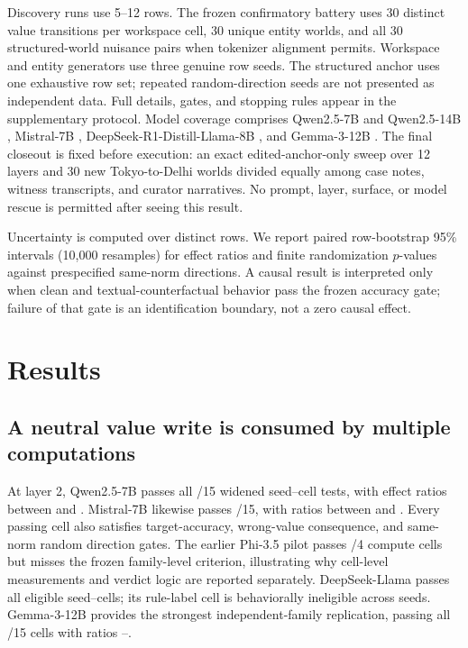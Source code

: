 \documentclass[10pt]{article}
\begin{document}
Discovery runs use 5--12 rows. The frozen confirmatory battery uses 30 distinct
value transitions per workspace cell, 30 unique entity worlds, and all 30
structured-world nuisance pairs when tokenizer alignment permits. Workspace
and entity generators use three genuine row seeds. The structured anchor uses
one exhaustive row set; repeated random-direction seeds are not presented as
independent data. Full details, gates, and stopping rules appear in the
supplementary protocol. Model coverage comprises Qwen2.5-7B and Qwen2.5-14B
\citep{yang2024qwen25}, Mistral-7B \citep{jiang2023mistral},
DeepSeek-R1-Distill-Llama-8B \citep{deepseek2025r1}, and Gemma-3-12B
\citep{gemmateam2025gemma3}.
The final closeout is fixed before execution: an exact edited-anchor-only sweep
over 12 layers and 30 new Tokyo-to-Delhi worlds divided equally among case
notes, witness transcripts, and curator narratives. No prompt, layer, surface,
or model rescue is permitted after seeing this result.

Uncertainty is computed over distinct rows. We report paired row-bootstrap
95\% intervals (10,000 resamples) for effect ratios and finite randomization
$p$-values against prespecified same-norm directions. A causal result is
interpreted only when clean and textual-counterfactual behavior pass the
frozen accuracy gate; failure of that gate is an identification boundary, not
a zero causal effect.

\section{Results}

\subsection{A neutral value write is consumed by multiple computations}

At layer 2, Qwen2.5-7B passes all \ConfirmQwenMatrixPass{}/15 widened
seed--cell tests, with effect ratios between \ConfirmQwenRatioMin{} and
\ConfirmQwenRatioMax{}. Mistral-7B likewise passes
\ConfirmMistralMatrixPass{}/15, with ratios between
\ConfirmMistralRatioMin{} and \ConfirmMistralRatioMax{}. Every passing cell
also satisfies target-accuracy, wrong-value consequence, and same-norm random
direction gates. The earlier Phi-3.5 pilot passes \PilotPhiComputePass{}/4
compute cells but misses the frozen family-level criterion, illustrating why
cell-level measurements and verdict logic are reported separately.
DeepSeek-Llama passes all \ConfirmDeepseekMatrixEligible{} eligible
seed--cells; its rule-label cell is behaviorally ineligible across seeds.
Gemma-3-12B provides the strongest independent-family replication, passing all
\ConfirmGemmaMatrixPass{}/15 cells with ratios
\ConfirmGemmaRatioMin{}--\ConfirmGemmaRatioMax{}.
\end{document}

